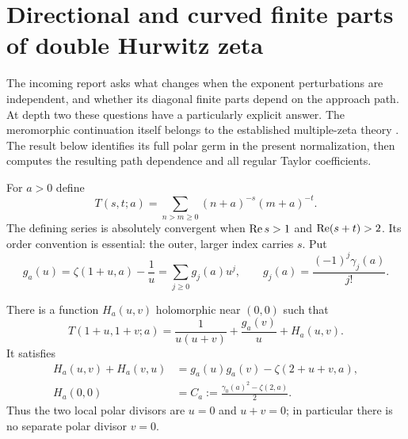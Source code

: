 \section{Directional and curved finite parts of double Hurwitz zeta}
\label{sec:direction}

The incoming report asks what changes when the exponent perturbations
are independent, and whether its diagonal finite parts depend on the
approach path. At depth two these questions have a particularly explicit
answer. The meromorphic continuation itself belongs to the established
multiple-zeta theory \cite{mow}. The result below identifies its full
polar germ in the present normalization, then computes the resulting
path dependence and all regular Taylor coefficients.

For $a>0$ define
\begin{equation}\label{eq:doublehurwitz}
 T(s,t;a)=\sum_{n>m\ge0}(n+a)^{-s}(m+a)^{-t}.
\end{equation}
The defining series is absolutely convergent when
$\operatorname{Re} s>1$ and $\operatorname{Re}(s+t)>2$. Its order convention is essential: the
outer, larger index carries $s$. Put
\[
 g_a(u)=\zeta(1+u,a)-\frac1u
       =\sum_{j\ge0}g_j(a)u^j,
 \qquad g_j(a)=\frac{(-1)^j\gamma_j(a)}{j!}.
\]

\begin{theorem}\label{thm:doublegerm}
There is a function $H_a(u,v)$ holomorphic near $(0,0)$ such that
\begin{equation}\label{eq:doublegerm}
 \boxed{T(1+u,1+v;a)
   =\frac1{u(u+v)}+\frac{g_a(v)}u+H_a(u,v).}
\end{equation}
It satisfies
\begin{align}
 H_a(u,v)+H_a(v,u)
   &=g_a(u)g_a(v)-\zeta(2+u+v,a),\label{eq:Hsym}\\
 H_a(0,0)&=C_a:=\frac{\gamma_0(a)^2-\zeta(2,a)}2.
 \label{eq:H00}
\end{align}
Thus the two local polar divisors are $u=0$ and $u+v=0$; in particular
there is no separate polar divisor $v=0$.
\end{theorem}

